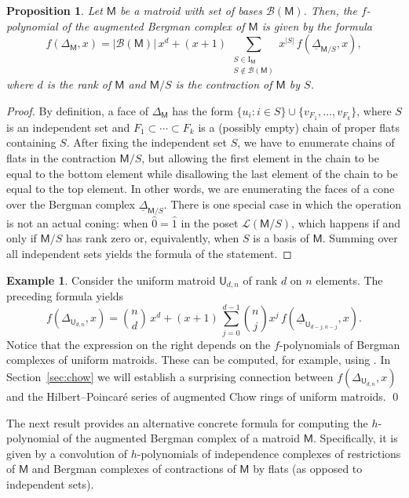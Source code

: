\documentclass[11pt]{amsart}
\theoremstyle{theorems}
\newtheorem{proposition}[theorem]{Proposition}
\theoremstyle{definition}
\newtheorem{example}[theorem]{Example}
\newcommand{\M}{{\mathsf{M}}}
\newcommand{\U}{{\mathsf{U}}}
\newcommand{\I}{{\mathrm{I}}}
\newcommand{\uDelta}{\underline{\Delta}}
\begin{document}
\begin{proposition} \label{prop:fOmega}
Let $\M$ be a matroid with set of bases $\mathscr{B}(\M)$. Then, the 
$f$-polynomial of the augmented Bergman complex of $\M$ is given by 
the formula
%
\[ f(\Delta_{\M},x) = |\mathscr{B}(\M)|\, x^d + (x+1) \, 
\sum_{\substack{S\in \I_{\M} \\ S \notin \mathscr{B}(\M)}} x^{|S|} \, 
f(\uDelta_{\M/S},x), \]
%
where $d$ is the rank of $\M$ and $\M/S$ is the contraction of $\M$ 
by $S$.
\end{proposition}

\begin{proof}
By definition, a face of $\Delta_{\M}$ has the form $\{u_i: i \in S\} 
\cup \{v_{F_1},\ldots, v_{F_k}\}$, where $S$ is an independent set and 
$F_1 \subset \cdots \subset F_k$ is a (possibly empty) chain of proper 
flats containing $S$. After fixing the independent set $S$, we have to 
enumerate chains of flats in the contraction $\M/S$, but allowing the 
first element in the chain to be equal to the bottom element while 
disallowing the last element of the chain to be equal to the top element.
In other words, we are enumerating the faces of a cone over the Bergman 
complex $\uDelta_{\M/S}$. There is one special case in which the 
operation is not an actual coning: when $\widehat{0}=\widehat{1}$ in 
the poset $\mathcal{L}(\M/S)$, which happens if and only if $\M/S$ has 
rank zero or, equivalently, when $S$ is a basis of $\M$. Summing over 
all independent sets yields the formula of the statement. 
\end{proof}


\begin{example} \label{ex:uniform} \rm
Consider the uniform matroid $\U_{d,n}$ of rank $d$ on $n$ elements. 
The preceding formula yields
%
\[ f(\Delta_{\U_{d,n}},x) = \binom{n}{d} \, x^d + (x+1) \, 
   \sum_{j=0}^{d-1} \binom{n}{j}x^{j} \, f(\uDelta_{\U_{d-j,n-j}},x). \]
%
Notice that the expression on the right depends on the $f$-polynomials 
of Bergman complexes of uniform matroids. These can be computed, for 
example, using \cite[Proposition~8.10]{FS24}. In Section~\ref{sec:chow} 
we will establish a surprising connection between $f(\Delta_{\U_{d,n}},x)$ 
and the Hilbert--Poincar\'e series of augmented Chow rings of uniform 
matroids. 
\qed
\end{example}

The next result provides an alternative concrete formula for computing 
the $h$-polynomial of the augmented Bergman complex of a matroid $\M$. 
Specifically, it is given by a convolution of $h$-polynomials of 
independence complexes of restrictions of $\M$ and Bergman complexes 
of contractions of $\M$ by flats (as opposed to independent sets).
\end{document}
